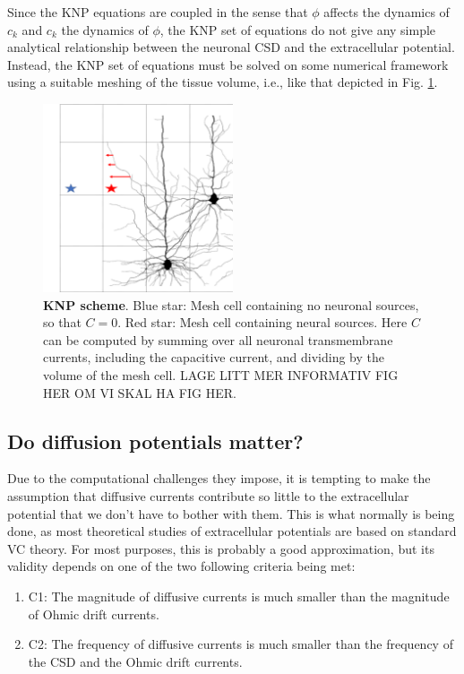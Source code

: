 Since the KNP equations are coupled in the sense that $\phi$ affects the dynamics of $c_k$ and $c_k$ the dynamics of $\phi$, the KNP set of equations do not give any simple analytical relationship between the neuronal CSD and the extracellular potential. Instead, the KNP set of equations must be solved on some numerical framework using a suitable meshing of the tissue volume, i.e., like that depicted in Fig. \ref{fig:KNPmesh}.

\begin{figure}[!ht]
\begin{center}
\includegraphics[width=0.5\textwidth]{Figures/KNP.png}
\end{center}
\caption{\textbf{KNP scheme}. Blue star: Mesh cell containing no neuronal sources, so that $C=0$. Red star: Mesh cell containing neural sources. Here $C$ can be computed by summing over all neuronal transmembrane currents, including the capacitive current, and dividing by the volume of the mesh cell. LAGE LITT MER INFORMATIV FIG HER OM VI SKAL HA FIG HER.}
\label{fig:KNPmesh}
\end{figure}


\subsection{Do diffusion potentials matter?}
Due to the computational challenges they impose, it is tempting to make the assumption that diffusive currents contribute so little to the extracellular potential that we don't have to bother with them. This is what normally is being done, as most theoretical studies of extracellular potentials are based on standard VC theory. For most purposes, this is probably a good approximation, but its validity depends on one of the two following criteria being met:

\begin{enumerate}
\item C1: The magnitude of diffusive currents is much smaller than the magnitude of Ohmic drift currents.
\item C2: The frequency of diffusive currents is much smaller than the frequency of the CSD and the Ohmic drift currents. 
\end{enumerate}

